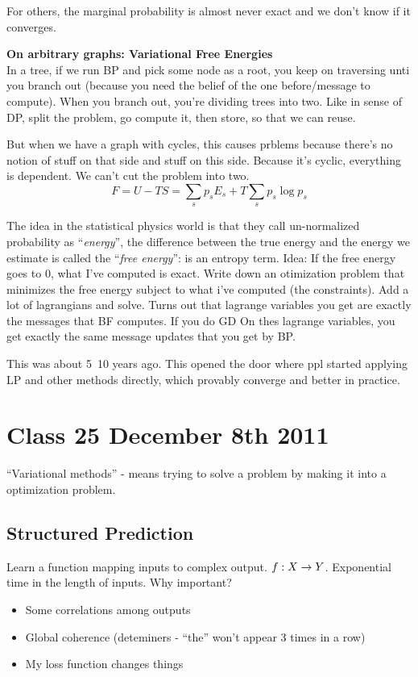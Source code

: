 For others, the marginal probability is almost never exact and we
don't know if it converges.

\textbf{On arbitrary graphs: Variational Free Energies}\\
In a tree, if we run BP and pick some node as a root, you keep on
traversing unti you branch out (because you need the belief of the one
before/message to compute). When you branch out, you're dividing trees
into two. Like in sense of DP, split the problem, go compute it, then
store, so that we can reuse.

But when we have a graph with cycles, this causes prblems because
there's no notion of stuff on that side and stuff on this
side. Because it's cyclic, everything is dependent. We can't cut the
problem into two. $$F = U-TS = \sum_sp_sE_s + T\sum_sp_s\log p_s$$

The idea in the statistical physics world is that they call
un-normalized probability as ``\emph{energy}'', the difference between the
true energy and the energy we estimate is called the ``\emph{free
  energy}'': is an entropy term. Idea: If the free energy goes to 0,
what I've computed is exact. Write down an otimization problem that
minimizes the free energy subject to what i've computed (the
constraints). Add a lot of lagrangians and solve. Turns out that lagrange variables you get are exactly
the messages that BF computes. If you do GD On thes lagrange
variables, you get exactly the same message updates that you get by
BP.

This was about 5~10 years ago. This opened the door where ppl started
applying LP and other methods directly, which provably converge and
better in practice.
\pagebreak
\section{Class 25 December 8th 2011}
``Variational methods'' - means trying to solve a problem by making it into a
optimization problem.

\subsection{Structured Prediction}

Learn a function mapping inputs to complex output. $f:X\rightarrow
Y$. Exponential time in the length of inputs.
Why important?
\begin{itemize}
\item Some correlations among outputs
\item Global coherence (deteminers - ``the'' won't appear 3 times in a row)
\item My loss function changes things
\end{itemize}

